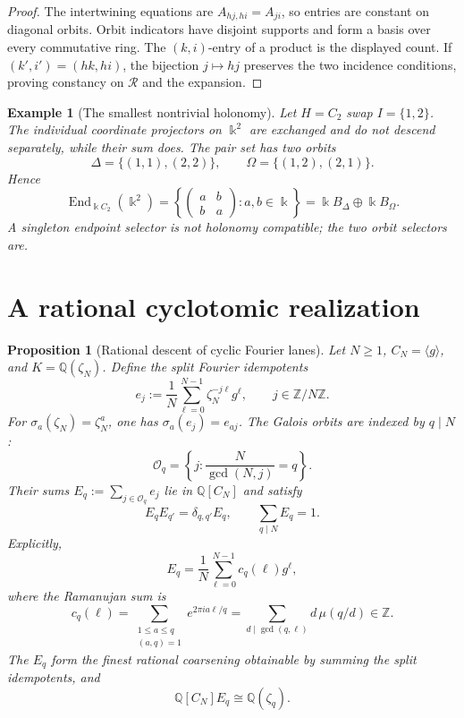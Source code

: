 \documentclass[11pt]{article}
\newtheorem{proposition}[theorem]{Proposition}
\newtheorem{example}[theorem]{Example}
\newcommand{\End}{\operatorname{End}}
\newcommand{\kk}{\Bbbk}
\begin{document}
\begin{proof}
The intertwining equations are \(A_{hj,hi}=A_{ji}\), so entries are constant on diagonal orbits.  Orbit indicators have disjoint supports and form a basis over every commutative ring.  The \((k,i)\)-entry of a product is the displayed count.  If \((k',i')=(hk,hi)\), the bijection \(j\mapsto hj\) preserves the two incidence conditions, proving constancy on \(\mathcal R\) and the expansion.
\end{proof}

\begin{example}[The smallest nontrivial holonomy]
Let \(H=C_2\) swap \(I=\{1,2\}\).  The individual coordinate projectors on \(\kk^2\) are exchanged and do not descend separately, while their sum does.  The pair set has two orbits
\[
 \Delta=\{(1,1),(2,2)\},\qquad
 \Omega=\{(1,2),(2,1)\}.
\]
Hence
\[
 \End_{\kk C_2}(\kk^2)
 =
 \left\{\begin{pmatrix}a&b\\b&a\end{pmatrix}:a,b\in\kk\right\}
 =\kk B_\Delta\oplus\kk B_\Omega.
\]
A singleton endpoint selector is not holonomy compatible; the two orbit selectors are.
\end{example}

\section{A rational cyclotomic realization}

\begin{proposition}[Rational descent of cyclic Fourier lanes]
\label{prop:cyclotomic}
Let \(N\geq1\), \(C_N=\langle g\rangle\), and \(K=\mathbb Q(\zeta_N)\).  Define the split Fourier idempotents
\[
 e_j:=\frac1N\sum_{\ell=0}^{N-1}\zeta_N^{-j\ell}g^\ell,
 \qquad j\in\mathbb Z/N\mathbb Z.
\]
For \(\sigma_a(\zeta_N)=\zeta_N^a\), one has \(\sigma_a(e_j)=e_{aj}\).  The Galois orbits are indexed by \(q\mid N\):
\[
 \mathcal O_q=\left\{j:\frac{N}{\gcd(N,j)}=q\right\}.
\]
Their sums \(E_q:=\sum_{j\in\mathcal O_q}e_j\) lie in \(\mathbb Q[C_N]\) and satisfy
\[
 E_qE_{q'}=\delta_{q,q'}E_q,
 \qquad \sum_{q\mid N}E_q=1.
\]
Explicitly,
\[
 \boxed{E_q=\frac1N\sum_{\ell=0}^{N-1}c_q(\ell)g^\ell,}
\]
where the Ramanujan sum is
\[
 c_q(\ell)=
 \sum_{\substack{1\leq a\leq q\\(a,q)=1}}e^{2\pi i a\ell/q}
 =\sum_{d\mid\gcd(q,\ell)}d\,\mu(q/d)\in\mathbb Z.
\]
The \(E_q\) form the finest rational coarsening obtainable by summing the split idempotents, and
\[
 \mathbb Q[C_N]E_q\cong\mathbb Q(\zeta_q).
\]
\end{proposition}
\end{document}

